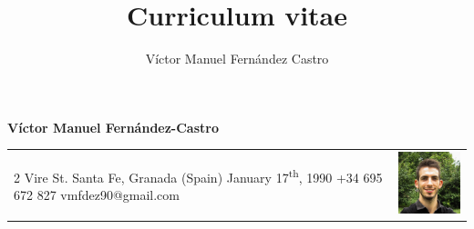 \documentclass[12pt,a4paper]{article}
\title{Curriculum vitae}
\author{Víctor Manuel Fernández Castro}
\begin{document}
	\large
	
	\begin{center}
		\textbf{Víctor Manuel Fernández-Castro}
	\end{center}
	
	\normalsize
	\centering

	\begin{tabular}{m{}m{}}
		2 Vire St. \newline
		Santa Fe, Granada (Spain) \newline
		January 17\textsuperscript{th}, 1990 \newline
		\newline
		+34 695 672 827 \newline
		vmfdez90@gmail.com & \includegraphics[width=3cm]{victor}
	\end{tabular}
	
	
\end{document}
